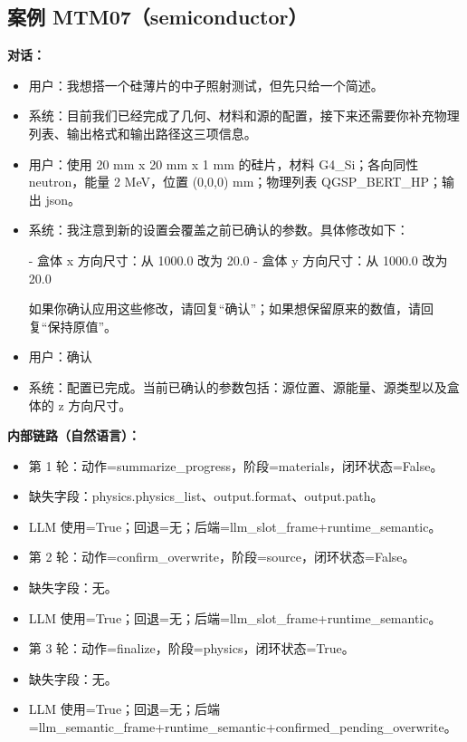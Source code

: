 \documentclass[11pt]{ctexart}
\begin{document}
\subsection{案例 MTM07（semiconductor）}
\textbf{对话：}
\begin{itemize}
\item 用户：我想搭一个硅薄片的中子照射测试，但先只给一个简述。
\item 系统：目前我们已经完成了几何、材料和源的配置，接下来还需要你补充物理列表、输出格式和输出路径这三项信息。
\item 用户：使用 20 mm x 20 mm x 1 mm 的硅片，材料 G4\_Si；各向同性 neutron，能量 2 MeV，位置 (0,0,0) mm；物理列表 QGSP\_BERT\_HP；输出 json。
\item 系统：我注意到新的设置会覆盖之前已确认的参数。具体修改如下：

- 盒体 x 方向尺寸：从 1000.0 改为 20.0
- 盒体 y 方向尺寸：从 1000.0 改为 20.0

如果你确认应用这些修改，请回复“确认”；如果想保留原来的数值，请回复“保持原值”。
\item 用户：确认
\item 系统：配置已完成。当前已确认的参数包括：源位置、源能量、源类型以及盒体的 z 方向尺寸。
\end{itemize}
\textbf{内部链路（自然语言）：}
\begin{itemize}
\item 第 1 轮：动作=summarize\_progress，阶段=materials，闭环状态=False。
\item 缺失字段：physics.physics\_list、output.format、output.path。
\item LLM 使用=True；回退=无；后端=llm\_slot\_frame+runtime\_semantic。
\item 第 2 轮：动作=confirm\_overwrite，阶段=source，闭环状态=False。
\item 缺失字段：无。
\item LLM 使用=True；回退=无；后端=llm\_slot\_frame+runtime\_semantic。
\item 第 3 轮：动作=finalize，阶段=physics，闭环状态=True。
\item 缺失字段：无。
\item LLM 使用=True；回退=无；后端=llm\_semantic\_frame+runtime\_semantic+confirmed\_pending\_overwrite。
\end{itemize}
\end{document}
